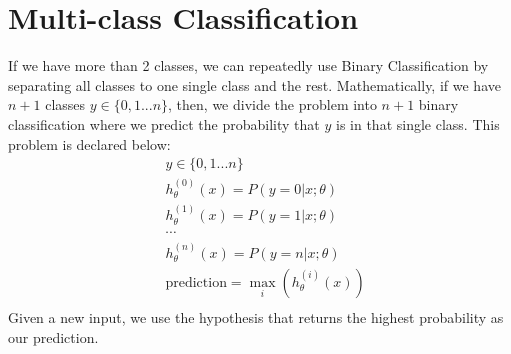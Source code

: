 \section{Multi-class Classification}
If we have more than 2 classes, we can repeatedly use Binary Classification by separating all classes to one single class and the rest. Mathematically, if we have $n + 1$ classes $y \in \lbrace0, 1 ... n\rbrace$, then, we divide the problem into $n+1$ binary classification where we predict the probability that $y$ is in that single class. This problem is declared below:
\begin{align*}
& y \in \lbrace0, 1 ... n\rbrace \\
& h_\theta^{(0)}(x) = P(y = 0 | x ; \theta) \\
& h_\theta^{(1)}(x) = P(y = 1 | x ; \theta) \\
& \cdots \\
& h_\theta^{(n)}(x) = P(y = n | x ; \theta) \\
& \mathrm{prediction} = \max_i( h_\theta ^{(i)}(x) )\\
\end{align*}
Given a new input, we use the hypothesis that returns the highest probability as our prediction.